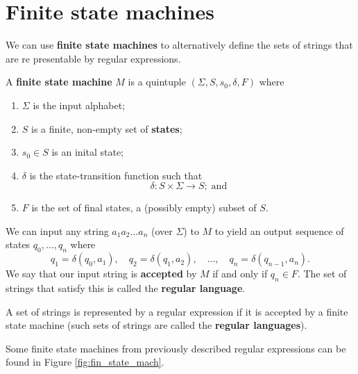 \section{Finite state machines}

We can use \textbf{finite state machines} to alternatively define the sets of strings that are re presentable by regular expressions.

\begin{definition}
    A \textbf{finite state machine} $M$ is a quintuple $(\Sigma, S, s_0, \delta, F)$ where 
    \begin{enumerate}
        \item $\Sigma$ is the input alphabet;
        \item $S$ is a finite, non-empty set of \textbf{states};
        \item $s_0 \in S$ is an inital state;
        \item $\delta$ is the state-transition function such that \[ \delta : S \times \Sigma \to S; \; \text{and} \]
        \item $F$ is the set of final states, a (possibly empty) subset of $S$.
    \end{enumerate}
\end{definition}

We can input any string $a_1 a_2 \ldots a_n$ (over $\Sigma$) to $M$ to yield an output sequence of states $q_0, \ldots, q_n$ where \[ q_1 = \delta(q_0, a_1), \quad q_2 = \delta(q_1, a_2), \quad \ldots, \quad q_n = \delta(q_{n - 1}, a_n). \] We say that our input string is \textbf{accepted} by $M$ if and only if $q_n \in F$. The set of strings that satisfy this is called the \textbf{regular language}.

\begin{theorem}
    A set of strings is represented by a regular expression if it is accepted by a finite state machine (such sets of strings are called the \textbf{regular languages}).
\end{theorem}

Some finite state machines from previously described regular expressions can be found in Figure \ref{fig:fin_state_mach}.

